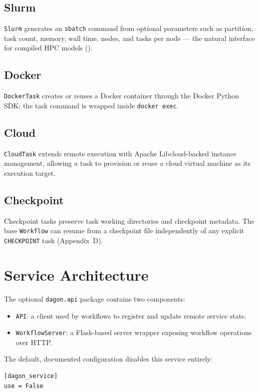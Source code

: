 \subsection{Slurm}
\texttt{Slurm} generates an \texttt{sbatch} command from optional parameters
such as partition, task count, memory, wall time, nodes, and tasks per node
--- the natural interface for compiled HPC models ().

\subsection{Docker}
\texttt{DockerTask} creates or reuses a Docker container through the Docker
Python SDK; the task command is wrapped inside \texttt{docker exec}.

\subsection{Cloud}
\texttt{CloudTask} extends remote execution with Apache Libcloud-backed
instance management, allowing a task to provision or reuse a cloud virtual
machine as its execution target.

\subsection{Checkpoint}
Checkpoint tasks preserve task working directories and checkpoint metadata.
The base \texttt{Workflow} can resume from a checkpoint file independently of
any explicit \texttt{CHECKPOINT} task (Appendix~D).

\section{Service Architecture}
\label{sec:service-architecture}

The optional \texttt{dagon.api} package contains two components:

\begin{itemize}[leftmargin=1.4em]
  \item \texttt{API}: a client used by workflows to register and update
    remote service state.
  \item \texttt{WorkflowServer}: a Flask-based server wrapper exposing
    workflow operations over HTTP.
\end{itemize}

The default, documented configuration disables this service entirely:

\begin{lstlisting}[style=ini]
[dagon_service]
use = False
\end{lstlisting}

